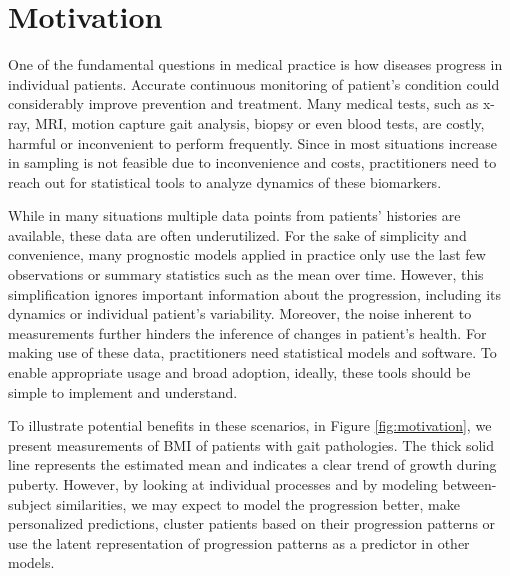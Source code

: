 \documentclass[preprint]{imsart}
\numberwithin{equation}{section}
\theoremstyle{plain}
\begin{document}
\maketitle

\tableofcontents

\section{Motivation}

One of the fundamental questions in medical practice is how diseases progress in individual patients. Accurate continuous monitoring of patient's condition could considerably improve prevention and treatment. Many medical tests, such as x-ray, MRI, motion capture gait analysis, biopsy or even blood tests, are costly, harmful or inconvenient to perform frequently. Since in most situations increase in sampling is not feasible due to inconvenience and costs, practitioners need to reach out for statistical tools to analyze dynamics of these biomarkers.

While in many situations multiple data points from patients' histories are available, these data are often underutilized. For the sake of simplicity and convenience, many prognostic models applied in practice only use the last few observations or summary statistics such as the mean over time. However, this simplification ignores important information about the progression, including its dynamics or individual patient's variability. Moreover, the noise inherent to measurements further hinders the inference of changes in patient's health. For making use of these data, practitioners need statistical models and software. To enable appropriate usage and broad adoption, ideally, these tools should be simple to implement and understand.


To illustrate potential benefits in these scenarios, in Figure \ref{fig:motivation}, we present measurements of BMI of patients with gait pathologies. The thick solid line represents the estimated mean and indicates a clear trend of growth during puberty. However, by looking at individual processes and by modeling between-subject similarities, we may expect to model the progression better, make personalized predictions, cluster patients based on their progression patterns or use the latent representation of progression patterns as a predictor in other models. 
\end{document}

